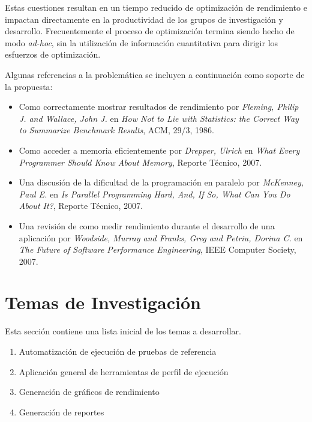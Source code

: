 \documentclass[a4paper]{article}
\begin{document}
\bigskip

Estas cuestiones resultan en un tiempo reducido de optimización de rendimiento
e impactan directamente en la productividad de los grupos de investigación y
desarrollo. Frecuentemente el proceso de optimización termina siendo
hecho de modo {\it ad-hoc}, sin la utilización de información cuantitativa para dirigir los
esfuerzos de optimización.

\bigskip

Algunas referencias a la problemática se incluyen a continuación como soporte de la propuesta:

\begin{itemize}

\item Como correctamente mostrar resultados de rendimiento por {\it Fleming, Philip J. and Wallace, John J.} en {\it How Not to Lie with Statistics: the Correct Way to Summarize Benchmark Results}, {ACM}, {29/3}, {1986}.

\item Como acceder a memoria eficientemente por {\it Drepper, Ulrich} en {\it What Every Programmer Should Know About Memory}, Reporte Técnico, 2007.

\item Una discusión de la dificultad de la programación en paralelo por {\it McKenney, Paul E.} en {\it Is Parallel Programming Hard, And, If So, What Can You Do About It?}, Reporte Técnico, 2007.

\item Una revisión de como medir rendimiento durante el desarrollo de una aplicación por {\it Woodside, Murray and Franks, Greg and Petriu, Dorina C.} en {\it The Future of Software Performance Engineering}, IEEE Computer Society, 2007.

\end{itemize}

\section{Temas de Investigación}

Esta sección contiene una lista inicial de los temas a desarrollar.

\begin{enumerate}
\item Automatización de ejecución de pruebas de referencia
\item Aplicación general de herramientas de perfil de ejecución
\item Generación de gráficos de rendimiento
\item Generación de reportes
\end{enumerate}
\end{document}
